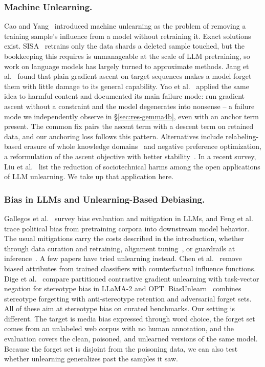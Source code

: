 \documentclass[runningheads]{llncs}
\begin{document}
\subsubsection{Machine Unlearning.}
Cao and Yang~\cite{cao2015towards} introduced machine unlearning as the
problem of removing a training sample's influence from a model without
retraining it. Exact solutions exist. SISA~\cite{bourtoule2021machine}
retrains only the data shards a deleted sample touched, but the
bookkeeping this requires is unmanageable at the scale of LLM
pretraining, so work on language models has largely turned to
approximate methods. Jang et al.~\cite{jang2023knowledge} found that
plain gradient ascent on target sequences makes a model forget them with
little damage to its general capability. Yao et al.~\cite{yao2024large}
applied the same idea to harmful content and documented its main failure
mode: run gradient ascent without a constraint and the model degenerates
into nonsense -- a failure mode we independently observe in
\S\ref{sec:res-gemma4b}, even with an anchor term present. The common fix pairs the ascent term with a descent term
on retained data, and our anchoring loss follows this pattern.
Alternatives include relabeling-based erasure of whole knowledge
domains~\cite{eldan2023whos} and negative preference optimization, a
reformulation of the ascent objective with better
stability~\cite{zhang2024negative}. In a recent survey, Liu et
al.~\cite{liu2025rethinking} list the reduction of sociotechnical harms
among the open applications of LLM unlearning. We take up that
application here.

\subsubsection{Bias in LLMs and Unlearning-Based Debiasing.}
Gallegos et al.~\cite{gallegos2024bias} survey bias evaluation and
mitigation in LLMs, and Feng et al.~\cite{feng2023pretraining} trace
political bias from pretraining corpora into downstream model behavior.
The usual mitigations carry the costs described in the introduction,
whether through data curation and retraining, alignment
tuning~\cite{ouyang2022training}, or guardrails at
inference~\cite{inan2023llamaguard}. A few papers have tried unlearning
instead. Chen et al.~\cite{chen2023fast} remove biased attributes from
trained classifiers with counterfactual influence functions. Dige et
al.~\cite{dige2024mitigating} compare partitioned contrastive gradient
unlearning with task-vector negation for stereotype bias in LLaMA-2 and
OPT. BiasUnlearn~\cite{liu2025bias} combines stereotype forgetting with
anti-stereotype retention and adversarial forget sets. All of these aim
at stereotype bias on curated benchmarks. Our setting is different. The
target is media bias expressed through word choice, the forget set comes
from an unlabeled web corpus with no human annotation, and the
evaluation covers the clean, poisoned, and unlearned versions of the
same model. Because the forget set is disjoint from the poisoning data,
we can also test whether unlearning generalizes past the samples it saw.
\end{document}
